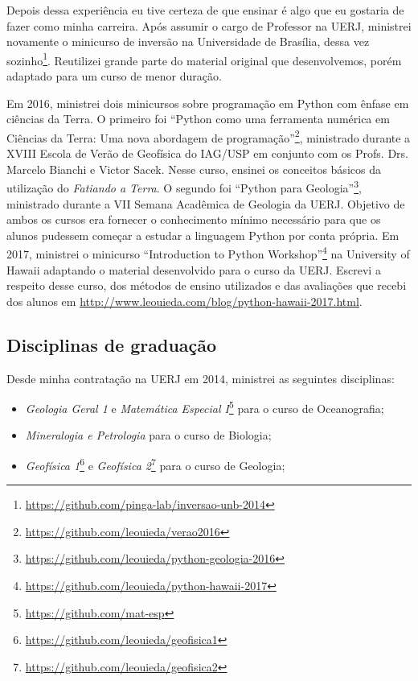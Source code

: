 \documentclass[12pt,a4paper,oneside,titlepage,onecolumn]{article}
\begin{document}
Depois dessa experiência eu tive certeza de que ensinar é algo que eu gostaria
de fazer como minha carreira.
Após assumir o cargo de Professor na UERJ, ministrei novamente o minicurso de
inversão na Universidade de Brasília, dessa vez
sozinho\footnote{\url{https://github.com/pinga-lab/inversao-unb-2014}}.
Reutilizei grande parte do material original que desenvolvemos, porém adaptado
para um curso de menor duração.

Em 2016, ministrei dois minicursos sobre programação em Python com ênfase em
ciências da Terra.
O primeiro foi ``Python como uma ferramenta numérica em Ciências da
Terra: Uma nova abordagem de
programação''\footnote{\url{https://github.com/leouieda/verao2016}}, ministrado
durante
a XVIII Escola de Verão de Geofísica do IAG/USP em conjunto com os Profs. Drs.
Marcelo Bianchi e Victor Sacek.
Nesse curso, ensinei os conceitos básicos da utilização do \textit{Fatiando a
Terra}.
O segundo foi ``Python para
Geologia''\footnote{\url{https://github.com/leouieda/python-geologia-2016}},
ministrado durante a
VII Semana Acadêmica de Geologia da UERJ.
Objetivo de ambos os cursos era fornecer o conhecimento mínimo necessário para
que os alunos pudessem começar a estudar a linguagem Python por conta própria.
Em 2017, ministrei o minicurso ``Introduction to Python
Workshop''\footnote{\url{https://github.com/leouieda/python-hawaii-2017}} na
University of Hawaii adaptando o material desenvolvido para o curso da UERJ.
Escrevi a respeito desse curso, dos métodos de ensino utilizados e das
avaliações que recebi dos alunos em
\url{http://www.leouieda.com/blog/python-hawaii-2017.html}.


\subsection{Disciplinas de graduação}

Desde minha contratação na UERJ em 2014, ministrei as seguintes disciplinas:

\begin{itemize}
    \item \textit{Geologia Geral 1} e \textit{Matemática Especial
        I}\footnote{\url{https://github.com/mat-esp}} para o curso de
        Oceanografia;
    \item \textit{Mineralogia e Petrologia} para o curso de Biologia;
    \item \textit{Geofísica
        1}\footnote{\url{https://github.com/leouieda/geofisica1}} e
        \textit{Geofísica
        2}\footnote{\url{https://github.com/leouieda/geofisica2}} para o curso
        de Geologia;
\end{itemize}
\end{document}
